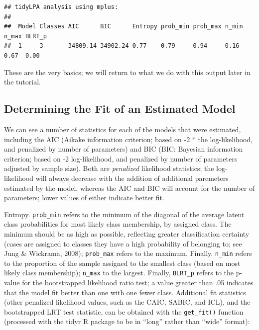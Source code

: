 \documentclass[man]{apa6}
\begin{document}
\begin{verbatim}
## tidyLPA analysis using mplus: 
## 
##  Model Classes AIC      BIC      Entropy prob_min prob_max n_min n_max BLRT_p
##  1     3       34809.14 34902.24 0.77    0.79     0.94     0.16  0.67  0.00
\end{verbatim}

These are the very basics; we will return to what we do with this output later
in the tutorial.

\hypertarget{determining-the-fit-of-an-estimated-model}{%
\subsection{Determining the Fit of an Estimated Model}\label{determining-the-fit-of-an-estimated-model}}

We can see a number of statistics for each of the models that were estimated,
including the AIC (Aikake information criterion; based on -2 * the
log-likelihood, and penalized by number of parameters) and BIC (BIC: Bayesian
information criterion; based on -2 log-likelihood, and penalized by number of
parameters adjusted by sample size). Both are \emph{penalized} likelihood statistics;
the log-likelihood will always decrease with the addition of additional
paremeters estimated by the model, whereas the AIC and BIC will account for the
number of parameters; lower values of either indicate better fit.

Entropy. \texttt{prob\_min} refers to the minimum of the diagonal of the average latent
class probabilities for most likely class membership, by assigned class. The
minimum should be as high as possible, reflecting greater classification
certainty (cases are assigned to classes they have a high probability of
belonging to; see Jung \& Wickrama, 2008); \texttt{prob\_max} refers to the maximum.
Finally. \texttt{n\_min} refers to the proportion of the sample assigned to the smallest
class (based on most likely class membership); \texttt{n\_max} to the largest. Finally,
\texttt{BLRT\_p} refers to the p-value for the bootstrapped likelihood ratio test; a
value greater than .05 indicates that the model fit better than one with one
fewer class. Additional fit statistics (other penalized likelihood values, such
as the CAIC, SABIC, and ICL), and the bootstrapped LRT test statistic, can be
obtained with the \texttt{get\_fit()} function (processed with the tidyr R package to be in \enquote{long} rather than \enquote{wide} format):
\end{document}

